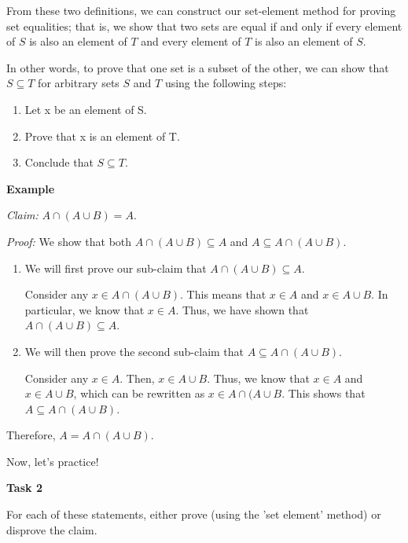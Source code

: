 \documentclass[12pt,letterpaper]{article}
\begin{document}
From these two definitions, we can construct our set-element method for proving set equalities; that is, we show that two sets are equal if and only if every element of $S$ is also an element of $T$ and every element of $T$ is also an element of $S$.

In other words, to prove that one set is a subset of the other, we can show that $S \subseteq T$ for arbitrary sets $S$ and $T$ using the following steps:
\begin{enumerate}[1.]
    \item Let x be an element of S.
    \item Prove that x is an element of T.
    \item Conclude that $S \subseteq T$.
\end{enumerate}

\textbf{Example}

\textit{Claim: } $A \cap (A \cup B) = A$.

\textit{Proof: } We show that both $A \cap (A \cup B) \subseteq A$ and $A \subseteq A \cap (A \cup B)$.
\begin{enumerate}
    \item We will first prove our sub-claim that $A \cap (A \cup B) \subseteq A$.
    
    Consider any $x \in A \cap (A \cup B)$. This means that $x \in A$ and $x \in A \cup B$. In particular, we know that $x \in A$. Thus, we have shown that $A \cap (A \cup B) \subseteq A$.
    
    \item We will then prove the second sub-claim that $A \subseteq A \cap (A \cup B)$.
    
    Consider any $x \in A$. Then, $x \in A \cup B$. Thus, we know that $x \in A$ and $x \in A \cup B$, which can be rewritten as $x \in A \cap (A \cup B$. This shows that $A \subseteq A \cap (A \cup B)$.
\end{enumerate}
Therefore, $A = A \cap (A \cup B)$.

Now, let's practice!

\newpage
\textbf{Task 2}

For each of these statements, either prove (using the 'set element' method) or disprove the claim.
\end{document}
